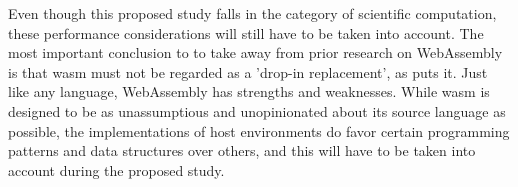 Even though this proposed study falls in the category of scientific computation, these performance considerations will still have to be taken into account. The most important conclusion to to take away from prior research on WebAssembly is that \ac{wasm} must not be regarded as a 'drop-in replacement', as \cite{melch_performance_2019} puts it. Just like any language, WebAssembly has strengths and weaknesses. While \ac{wasm} is designed to be as unassumptious and unopinionated about its source language as possible, the implementations of host environments do favor certain programming patterns and data structures over others, and this will have to be taken into account during the proposed study.







